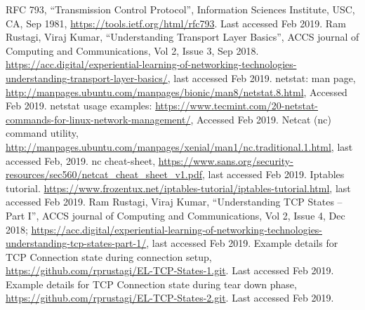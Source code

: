 \begin{multicols}{2}
\begin{thebibliography}{99}
 RFC 793, ``Transmission Control Protocol'', Information Sciences Institute, USC, CA, Sep 1981, \url{https://tools.ietf.org/html/rfc793}. Last accessed Feb 2019.
 Ram Rustagi, Viraj Kumar, ``Understanding Transport Layer Basics'', ACCS journal of Computing and Communications, Vol 2, Issue 3, Sep 2018. \url{https://acc.digital/experiential-learning-of-networking-technologies-understanding-transport-layer-basics/}, last accessed Feb 2019.
 netstat: man page, \url{http://manpages.ubuntu.com/manpages/bionic/man8/netstat.8.html}, Accessed Feb 2019.
 netstat usage examples: \url{https://www.tecmint.com/20-netstat-commands-for-linux-network-management/}, Accessed Feb 2019.
 Netcat (nc) command utility, \url{http://manpages.ubuntu.com/manpages/xenial/man1/nc.traditional.1.html}, last accessed Feb, 2019.
 nc cheat-sheet, \url{https://www.sans.org/security-resources/sec560/netcat_cheat_sheet_v1.pdf}, last accessed Feb 2019.
 Iptables tutorial. \url{https://www.frozentux.net/iptables-tutorial/iptables-tutorial.html}, last accessed Feb 2019.
 Ram Rustagi, Viraj Kumar, ``Understanding TCP States -- Part I'', ACCS journal of Computing and Communications, Vol 2, Issue 4, Dec 2018; \url{https://acc.digital/experiential-learning-of-networking-technologies-understanding-tcp-states-part-1/}, last accessed Feb 2019.
 Example details for TCP Connection state during connection setup, \url{https://github.com/rprustagi/EL-TCP-States-1.git}. Last accessed Feb 2019.
 Example details for TCP Connection state during tear down phase, \url{https://github.com/rprustagi/EL-TCP-States-2.git}. Last accessed Feb 2019.
\end{thebibliography}
\end{multicols}
